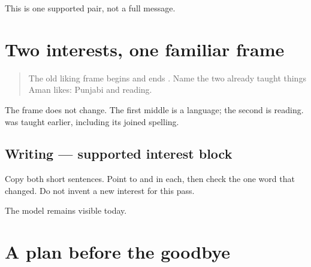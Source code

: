 \begin{tcolorbox}[breakable,colback=teal!4,colframe=teal!35!black,title={Before you move on}]
This is one supported pair, not a full message.
\end{tcolorbox}
\section[\texorpdfstring{\pa{ਮੈਨੂੰ} \pa{ਪੰਜਾਬੀ} \pa{ਪਸੰਦ} \pa{ਹੈ।} … (mainū̃ panjābī …)}{ਮੈਨੂੰ ਪੰਜਾਬੀ ਪਸੰਦ ਹੈ। … (mainū̃ panjābī …)}]{Two interests, one familiar frame}

\label{lesson:PA-W12-interests-supported}



\begin{quote}
The old liking frame begins \textbf{} and ends \textbf{ }. Name the two already taught things Aman likes: Punjabi and reading.
\end{quote}

\begin{tcolorbox}[breakable,skin=enhanced,colback=orange!6,colframe=orange!45!black,boxrule=0.5pt,arc=1mm,left=6pt,right=6pt,top=4pt,bottom=4pt,fonttitle=\bfseries,title={Read this}]
\begin{quote}
   
\end{quote}

\begin{quote}
   
\end{quote}

The frame does not change. The first middle is a language; the second is reading. \textbf{} was taught earlier, including its joined spelling.
\end{tcolorbox}

\subsection*{Writing — supported interest block}
Copy both short sentences. Point to \textbf{} and \textbf{ } in each, then check the one word that changed. Do not invent a new interest for this pass.

\begin{tcolorbox}[breakable,colback=teal!4,colframe=teal!35!black,title={Before you move on}]
The model remains visible today.
\end{tcolorbox}
\section[\texorpdfstring{\pa{ਅਸੀਂ} \pa{ਜਲਦੀ} \pa{ਮਿਲਾਂਗੇ।} (asī̃ jaldī milāṁge)}{ਅਸੀਂ ਜਲਦੀ ਮਿਲਾਂਗੇ। (asī̃ jaldī milāṁge)}]{A plan before the goodbye}

